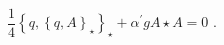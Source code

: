 \begin{equation}
\frac{1}{4}\left\{q,\left\{q,A\right\}_\star\right\}_\star +{\alpha^{\prime}}
g A\star A=0\,\,.
\end{equation}

